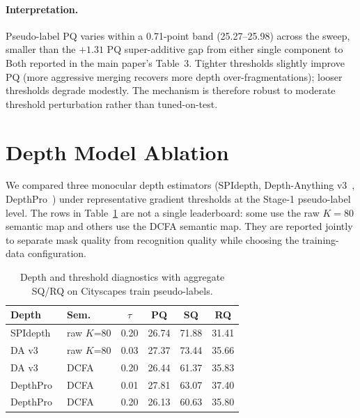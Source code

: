 \documentclass{article}
\begin{document}
\paragraph{Interpretation.}
Pseudo-label PQ varies within a 0.71-point band (25.27--25.98) across the sweep, smaller than the $+1.31$ PQ super-additive gap from either single component to Both reported in the main paper's Table~3. Tighter thresholds slightly improve PQ (more aggressive merging recovers more depth over-fragmentations); looser thresholds degrade modestly. The mechanism is therefore robust to moderate threshold perturbation rather than tuned-on-test.

\section{Depth Model Ablation}
\label{sec:supp:depth}

We compared three monocular depth estimators (SPIdepth, Depth-Anything v3~\cite{lin2025da3}, DepthPro~\cite{bochkovskii2024depthpro}) under representative gradient thresholds at the Stage-1 pseudo-label level. The rows in Table~\ref{tab:depth} are not a single leaderboard: some use the raw $K{=}80$ semantic map and others use the DCFA semantic map. They are reported jointly to separate mask quality from recognition quality while choosing the training-data configuration.

\begin{table}[H]
\caption{Depth and threshold diagnostics with aggregate SQ/RQ on Cityscapes train pseudo-labels.}
\label{tab:depth}
\centering
\small
\setlength{\tabcolsep}{6pt}
\begin{tabular}{l l c c c c}
\toprule
Depth & Sem. & $\tau$ & PQ & SQ & RQ \\
\midrule
SPIdepth & raw $K$=80 & 0.20 & 26.74 & 71.88 & 31.41 \\
DA v3~\cite{lin2025da3} & raw $K$=80 & 0.03 & 27.37 & 73.44 & 35.66 \\
DA v3~\cite{lin2025da3} & DCFA & 0.20 & 26.44 & 61.37 & 35.83 \\
DepthPro~\cite{bochkovskii2024depthpro} & DCFA & 0.01 & 27.81 & 63.07 & 37.40 \\
DepthPro~\cite{bochkovskii2024depthpro} & DCFA & 0.20 & 26.13 & 60.63 & 35.80 \\
\bottomrule
\end{tabular}
\end{table}
\end{document}
